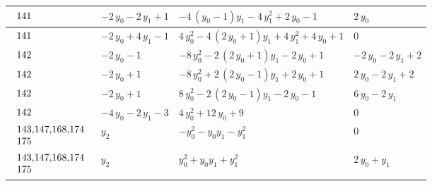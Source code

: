 \begin{table}[H]
\begin{center}
{\begin{tabular}{|l|l|l|l|}
$\begin{tabular}{l}
141 \\
\end{tabular}$ & $ -2 \, y_{0} - 2 \, y_{1} + 1 $ & $ -4 \, {\left(y_{0} - 1\right)} y_{1} - 4 \, y_{1}^{2} + 2 \, y_{0} - 1 $ & $ 2 \, y_{0} $ \\ \hline
$\begin{tabular}{l}
141 \\
\end{tabular}$ & $ -2 \, y_{0} + 4 \, y_{1} - 1 $ & $ 4 \, y_{0}^{2} - 4 \, {\left(2 \, y_{0} + 1\right)} y_{1} + 4 \, y_{1}^{2} + 4 \, y_{0} + 1 $ & $ 0 $ \\ \hline
$\begin{tabular}{l}
142 \\
\end{tabular}$ & $ -2 \, y_{0} - 1 $ & $ -8 \, y_{0}^{2} - 2 \, {\left(2 \, y_{0} + 1\right)} y_{1} - 2 \, y_{0} + 1 $ & $ -2 \, y_{0} - 2 \, y_{1} + 2 $ \\ \hline
$\begin{tabular}{l}
142 \\
\end{tabular}$ & $ -2 \, y_{0} + 1 $ & $ -8 \, y_{0}^{2} + 2 \, {\left(2 \, y_{0} - 1\right)} y_{1} + 2 \, y_{0} + 1 $ & $ 2 \, y_{0} - 2 \, y_{1} + 2 $ \\ \hline
$\begin{tabular}{l}
142 \\
\end{tabular}$ & $ -2 \, y_{0} + 1 $ & $ 8 \, y_{0}^{2} - 2 \, {\left(2 \, y_{0} - 1\right)} y_{1} - 2 \, y_{0} - 1 $ & $ 6 \, y_{0} - 2 \, y_{1} $ \\ \hline
$\begin{tabular}{l}
142 \\
\end{tabular}$ & $ -4 \, y_{0} - 2 \, y_{1} - 3 $ & $ 4 \, y_{0}^{2} + 12 \, y_{0} + 9 $ & $ 0 $ \\ \hline
$\begin{tabular}{l}
143,147,168,174 \\
175 \\
\end{tabular}$ & $ y_{2} $ & $ -y_{0}^{2} - y_{0} y_{1} - y_{1}^{2} $ & $ 0 $ \\ \hline
$\begin{tabular}{l}
143,147,168,174 \\
175 \\
\end{tabular}$ & $ y_{2} $ & $ y_{0}^{2} + y_{0} y_{1} + y_{1}^{2} $ & $ 2 \, y_{0} + y_{1} $ \\ \hline

\end{tabular}}
\end{center}
\end{table}
